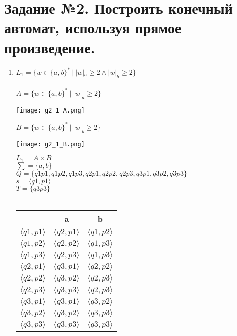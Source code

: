 \documentclass{article}
\begin{document}
\section{Задание №2. Построить конечный автомат, используя прямое произведение.}
\begin{enumerate}
    \item {$L_1 = \{ w \in \{ a, b\}^* \ | \ |w|_a \geq 2 \wedge |w|_b \geq 2 \}$} \\ \\
    $A = \{ w \in \{ a, b\}^* \ | \ |w|_a \geq 2 \}$
    \begin{flushleft}
        \texttt{[image: g2\_1\_A.png]}
    \end{flushleft}
    $B = \{ w \in \{ a, b\}^* \ | \ |w|_b \geq 2 \}$
    \begin{flushleft}
        \texttt{[image: g2\_1\_B.png]}
    \end{flushleft}
    $L_1 = A \times B$ \\
    $\sum = \{a, b\}$ \\
    $Q = \{q1p1, q1p2, q1p3, q2p1, q2p2, q2p3, q3p1, q3p2, q3p3\}$ \\
    $s = \langle q1, p1 \rangle $ \\
    $T = \{q3p3\}$ \\ \\
    \begin{tabular}{|c|c|c|}
        \hline
                              & a                         & b     \\ \hline
         $\langle q1,p1 \rangle$    & $\langle q2,p1 \rangle$   & $\langle q1,p2 \rangle$    \\
         $\langle q1,p2 \rangle$    & $\langle q2,p2 \rangle$   & $\langle q1,p3 \rangle$    \\ 
         $\langle q1,p3 \rangle$    & $\langle q2,p3 \rangle$   & $\langle q1,p3 \rangle$    \\
         $\langle q2,p1 \rangle$    & $\langle q3,p1 \rangle$   & $\langle q2,p2 \rangle$    \\
         $\langle q2,p2 \rangle$    & $\langle q3,p2 \rangle$   & $\langle q2,p3 \rangle$    \\ 
         $\langle q2,p3 \rangle$    & $\langle q3,p3 \rangle$   & $\langle q2,p3 \rangle$    \\
         $\langle q3,p1 \rangle$    & $\langle q3,p1 \rangle$   & $\langle q3,p2 \rangle$    \\
         $\langle q3,p2 \rangle$    & $\langle q3,p2 \rangle$   & $\langle q3,p3 \rangle$    \\ 
         $\langle q3,p3 \rangle$    & $\langle q3,p3 \rangle$   & $\langle q3,p3 \rangle$    \\ \hline
    \end{tabular} \\
    

\end{enumerate}
\end{document}
